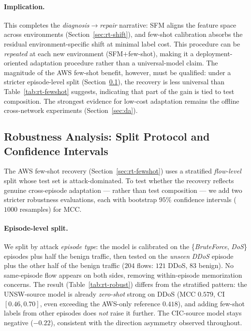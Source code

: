 \documentclass[preprint,12pt,authoryear]{elsarticle}
\begin{document}
\paragraph{Implication.} This completes the \emph{diagnosis}$\to$\emph{repair}
narrative: SFM aligns the feature space across environments
(Section~\ref{sec:rt-shift}), and few-shot calibration absorbs the residual
environment-specific shift at minimal label cost. This procedure can be
\emph{repeated} at each new environment (SFM$+$few-shot), making it a
deployment-oriented adaptation procedure rather than a universal-model claim. The
magnitude of the AWS few-shot benefit, however, must be qualified: under a stricter
episode-level split (Section~\ref{sec:rt-robust}), the recovery is less universal
than Table~\ref{tab:rt-fewshot} suggests, indicating that part of the gain is tied
to test composition. The strongest evidence for low-cost adaptation remains the
offline cross-network experiments (Section~\ref{sec:da}).

\subsection{Robustness Analysis: Split Protocol and Confidence Intervals}
\label{sec:rt-robust}

The AWS few-shot recovery (Section~\ref{sec:rt-fewshot}) uses a stratified
\emph{flow-level} split whose test set is attack-dominated. To test whether the
recovery reflects genuine cross-episode adaptation --- rather than test composition
--- we add two stricter robustness evaluations, each with bootstrap $95\%$
confidence intervals ($1000$ resamples) for MCC.

\paragraph{Episode-level split.} We split by attack \emph{episode type}: the model
is calibrated on the \{\emph{BruteForce}, \emph{DoS}\} episodes plus half the benign
traffic, then tested on the \emph{unseen} \emph{DDoS} episode plus the other half of
the benign traffic ($204$ flows: $121$ DDoS, $83$ benign). No same-episode flow
appears on both sides, removing within-episode memorization concerns. The result
(Table~\ref{tab:rt-robust}) differs from the stratified pattern: the UNSW-source
model is already \emph{zero-shot} strong on DDoS (MCC $0.579$, CI $[0.46,0.70]$,
even exceeding the AWS-only reference $0.418$), and adding few-shot labels from other
episodes does \emph{not} raise it further. The CIC-source model stays negative
($-0.22$), consistent with the direction asymmetry observed throughout.
\end{document}
